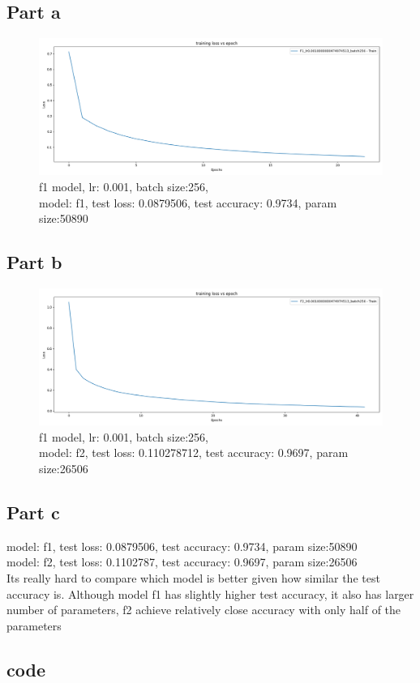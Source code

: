\newpage
\section{}
\subsection*{Part a}
\begin{figure}[!htbp]
    \centering\includegraphics[width=1\linewidth]{f1_batch256.png}
    \caption*{f1 model, lr: 0.001, batch size:256,\\ 
    model: f1, test loss: 0.0879506, test accuracy: 0.9734, param size:50890}
\end{figure}
\subsection*{Part b}
\begin{figure}[!htbp]
    \centering\includegraphics[width=1\linewidth]{F2_batch256.png}
    \caption*{f1 model, lr: 0.001, batch size:256,\\ 
    model: f2, test loss: 0.110278712, test accuracy: 0.9697, param size:26506}
\end{figure}
\subsection*{Part c}
model: f1, test loss: 0.0879506, test accuracy: 0.9734, param size:50890\\
model: f2, test loss: 0.1102787, test accuracy: 0.9697, param size:26506\\
\newline
Its really hard to compare which model is better given how similar the test accuracy is.
Although model f1 has slightly higher test accuracy, it also has larger number of parameters,
f2 achieve relatively close accuracy with only half of the parameters

\subsection*{code}
\inputminted{python3}{../homeworks/neural_network_mnist/main.py}